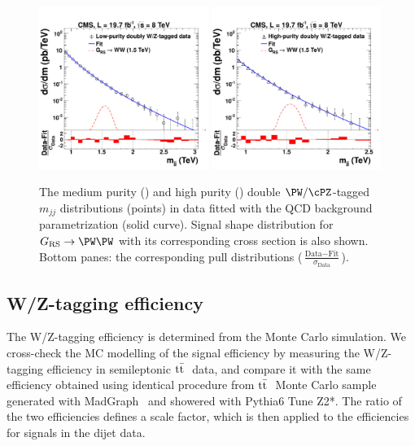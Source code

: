 \begin{figure}[th!b]
\begin{center}
\includegraphics[width=0.49\textwidth]{figs/MediumPuriVVFitAndPull.pdf}
\includegraphics[width=0.49\textwidth]{figs/HighPuriVVFitAndPull.pdf}
\end{center}
\caption{The medium purity (\cmsLeft) and high purity (\cmsRight) double $\PW/\cPZ$-tagged $m_{jj}$
  distributions (points) in data fitted with the QCD background parametrization (solid
  curve).  Signal shape distribution for
  $\GRS \to \PW\PW$ with its corresponding cross section is also shown.  Bottom panes:
  the corresponding pull distributions ($\frac{\text{Data}-\text{Fit}}{\sigma_{\text{Data}}}$).  }
\label{fig:doubleVtagBG}
\end{figure}



\subsection{W/Z-tagging efficiency}
\label{sec:vtageff}

The W/Z-tagging efficiency is determined from the Monte Carlo simulation.
We cross-check the MC modelling of the signal efficiency by measuring the W/Z-tagging efficiency
in semileptonic $\mathrm{t}\bar{\mathrm{t}}~$ data, and compare it
with the same efficiency obtained using identical procedure from $\mathrm{t}\bar{\mathrm{t}}~$ Monte Carlo sample generated with MadGraph~\cite{madgraph} and showered with Pythia6 Tune Z2*.
The ratio of the two efficiencies defines a scale factor, which is then applied to
the efficiencies for signals in the dijet data.

